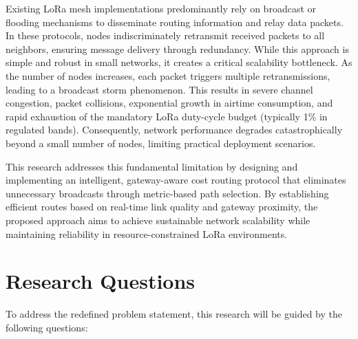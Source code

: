 Existing LoRa mesh implementations predominantly rely on broadcast or flooding mechanisms to disseminate routing information and relay data packets. In these protocols, nodes indiscriminately retransmit received packets to all neighbors, ensuring message delivery through redundancy. While this approach is simple and robust in small networks, it creates a critical scalability bottleneck. As the number of nodes increases, each packet triggers multiple retransmissions, leading to a broadcast storm phenomenon. This results in severe channel congestion, packet collisions, exponential growth in airtime consumption, and rapid exhaustion of the mandatory LoRa duty-cycle budget (typically 1\% in regulated bands). Consequently, network performance degrades catastrophically beyond a small number of nodes, limiting practical deployment scenarios.

This research addresses this fundamental limitation by designing and implementing an intelligent, gateway-aware cost routing protocol that eliminates unnecessary broadcasts through metric-based path selection. By establishing efficient routes based on real-time link quality and gateway proximity, the proposed approach aims to achieve sustainable network scalability while maintaining reliability in resource-constrained LoRa environments.

\section{Research Questions}
\label{sec:research-questions}

To address the redefined problem statement, this research will be guided by the following questions:

